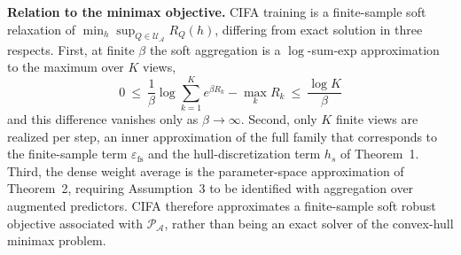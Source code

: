 \documentclass[electronics,article,submit,moreauthors]{Definitions/mdpi}
\begin{document}
\noindent\textbf{Relation to the minimax objective.} CIFA training is a finite-sample soft relaxation of $\min_h\sup_{Q\in\mathcal{U}_{\mathcal{A}}}R_Q(h)$, differing from exact solution in three respects. First, at finite $\beta$ the soft aggregation is a $\log$-sum-exp approximation to the maximum over $K$ views,
\begin{equation}
0\ \leq\ \frac{1}{\beta}\log\sum_{k=1}^{K}e^{\beta R_k}-\max_k R_k\ \leq\ \frac{\log K}{\beta}
\end{equation}
and this difference vanishes only as $\beta\to\infty$. Second, only $K$ finite views are realized per step, an inner approximation of the full family that corresponds to the finite-sample term $\varepsilon_{\mathrm{fs}}$ and the hull-discretization term $h_s$ of Theorem~1. Third, the dense weight average is the parameter-space approximation of Theorem~2, requiring Assumption~3 to be identified with aggregation over augmented predictors. CIFA therefore approximates a finite-sample soft robust objective associated with $\mathcal{P}_{\mathcal{A}}$, rather than being an exact solver of the convex-hull minimax problem.
\end{document}
